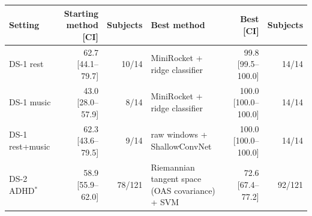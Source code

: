 \scriptsize
\begin{tabular}{lrrp{3.8cm}rr}
\hline
Setting & Starting method [CI] & Subjects & Best method & Best [CI] & Subjects \\
\hline
DS-1 rest & 62.7 [44.1--79.7] & 10/14 & MiniRocket + ridge classifier & 99.8 [99.5--100.0] & 14/14 \\
DS-1 music & 43.0 [28.0--57.9] & 8/14 & MiniRocket + ridge classifier & 100.0 [100.0--100.0] & 14/14 \\
DS-1 rest+music & 62.3 [43.6--79.5] & 9/14 & raw windows + ShallowConvNet & 100.0 [100.0--100.0] & 14/14 \\
DS-2 ADHD$^\ast$ & 58.9 [55.9--62.0] & 78/121 & Riemannian tangent space (OAS covariance) + SVM & 72.6 [67.4--77.2] & 92/121 \\
\hline
\end{tabular}
